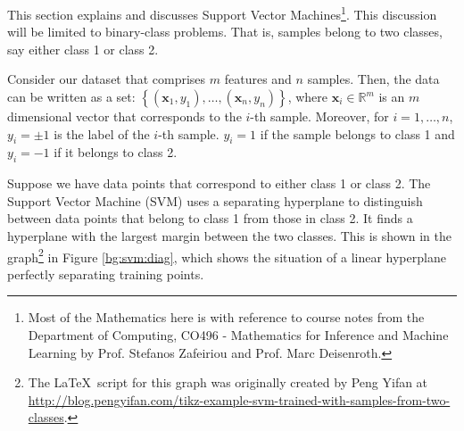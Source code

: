 \documentclass[12pt, twoside, a4paper]{report}
\begin{document}
This section explains and discusses Support Vector Machines\footnote{Most of the Mathematics here is with reference to course notes from the Department of Computing, CO496 - Mathematics for Inference and Machine Learning by Prof. Stefanos Zafeiriou and Prof. Marc Deisenroth.}. This discussion will be limited to binary-class problems. That is, samples belong to two classes, say either class 1 or class 2.

Consider our dataset that comprises $m$ features and $n$ samples. Then, the data can be written as a set: $\left\lbrace (\boldsymbol{x}_1, y_1), \dots, (\boldsymbol{x}_n, y_n) \right\rbrace$, where $\boldsymbol{x}_i \in \mathbb{R}^m$ is an $m$ dimensional vector that corresponds to the $i$-th sample. Moreover, for $i = 1, \dots , n$, $y_i = \pm 1$ is the label of the $i$-th sample. $y_i = 1$ if the sample belongs to class 1 and $y_i = -1$ if it belongs to class 2.

Suppose we have data points that correspond to either class 1 or class 2. The Support Vector Machine (SVM) \cite{RefWorks:122} uses a separating hyperplane to distinguish between data points that belong to class 1 from those in class 2. It finds a hyperplane with the largest margin between the two classes. This is shown in the graph\footnote{The \LaTeX $\,$ script for this graph was originally created by Peng Yifan at \url{http://blog.pengyifan.com/tikz-example-svm-trained-with-samples-from-two-classes}.} in Figure \ref{bg:svm:diag}, which shows the situation of a linear hyperplane perfectly separating training points.
\end{document}
